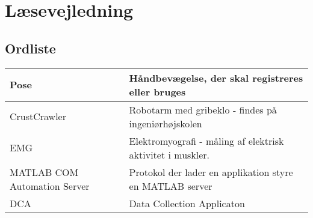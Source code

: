 \section{Læsevejledning}
\subsection*{Ordliste}

\begin{tabular}{p{90pt}p{240pt}}
	Pose & Håndbevægelse, der skal registreres eller bruges\\ \hline
	CrustCrawler & Robotarm med gribeklo - findes på ingeniørhøjskolen\\ \hline
	EMG & Elektromyografi - måling af elektrisk aktivitet i muskler.\\ \hline
	MATLAB COM Automation Server & Protokol der lader en applikation styre en MATLAB server\citep{RefWorks:5}\\ \hline
	DCA & Data Collection Applicaton\\
\end{tabular}